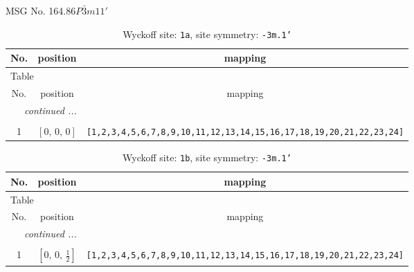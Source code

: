\documentclass[fleqn,8pt]{jsarticle}
\begin{document}
\setcounter{MaxMatrixCols}{32}

\renewcommand{\tablename}{Table~}
\renewcommand{\figurename}{Figure~}
\begin{center}
\LARGE
MSG No. 164.86\quad$P\bar{3}m11'$
\end{center}
\renewcommand{\arraystretch}{1.2}
\begin{longtable}{ccc}
\caption{Wyckoff site: {\tt 1a}, site symmetry: {\tt -3m.1'}}
 \\
 \hline \hline
No. & position & mapping \\ \hline \endfirsthead

\multicolumn{2}{l}{\tablename\ \thetable{}} \\
 \hline \hline
No. & position & mapping \\ \hline \endhead

 \hline \hline
\multicolumn{2}{r}{\footnotesize\it continued ...} \\ \endfoot

 \hline \hline
\multicolumn{2}{r}{} \\ \endlastfoot

1 & $\left[ 0,\, 0,\, 0 \right]$ & {\tt [1,2,3,4,5,6,7,8,9,10,11,12,13,14,15,16,17,18,19,20,21,22,23,24]} \\
\end{longtable}
\renewcommand{\arraystretch}{1.2}
\begin{longtable}{ccc}
\caption{Wyckoff site: {\tt 1b}, site symmetry: {\tt -3m.1'}}
 \\
 \hline \hline
No. & position & mapping \\ \hline \endfirsthead

\multicolumn{2}{l}{\tablename\ \thetable{}} \\
 \hline \hline
No. & position & mapping \\ \hline \endhead

 \hline \hline
\multicolumn{2}{r}{\footnotesize\it continued ...} \\ \endfoot

 \hline \hline
\multicolumn{2}{r}{} \\ \endlastfoot

1 & $\left[ 0,\, 0,\, \frac{1}{2} \right]$ & {\tt [1,2,3,4,5,6,7,8,9,10,11,12,13,14,15,16,17,18,19,20,21,22,23,24]} \\
\end{longtable}
\renewcommand{\arraystretch}{1.2}
\end{document}
